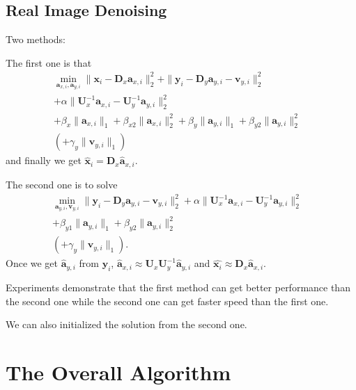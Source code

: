 \documentclass[10pt,twocolumn,letterpaper]{article}
\begin{document}
\subsection{Real Image Denoising}
Two methods:

The first one is that
\begin{equation}
\begin{split}
\min_{\mathbf{a}_{x,i},\mathbf{a}_{y,i}}
\|\mathbf{x}_{i}-\mathbf{D}_{x}\mathbf{a}_{x,i}\|_{2}^{2}
+
\|\mathbf{y}_{i}-\mathbf{D}_{y}\mathbf{a}_{y,i}-\mathbf{v}_{y,i}\|_{2}^{2}
\\
+
\alpha
\|\mathbf{U}_{x}^{-1}\mathbf{a}_{x,i}-\mathbf{U}_{y}^{-1}\mathbf{a}_{y,i}\|_{2}^{2}&
\\
+
\beta_{x}\|\mathbf{a}_{x,i}\|_{1}
+
\beta_{x2}\|\mathbf{a}_{x,i}\|_{2}^{2}
+
\beta_{y}\|\mathbf{a}_{y,i}\|_{1}
+
\beta_{y2}\|\mathbf{a}_{y,i}\|_{2}^{2}
&
\\
(+
\gamma_{y}\|\mathbf{v}_{y,i}\|_{1})
\end{split}
\end{equation}
and finally we get $\widehat{\mathbf{x}}_{i}=\mathbf{D}_{x}\widehat{\mathbf{a}}_{x,i}$.

The second one is to solve
\begin{equation}
\begin{split}
\min_{\mathbf{a}_{y,i},\mathbf{v}_{y,i}}
\|\mathbf{y}_{i}-\mathbf{D}_{y}\mathbf{a}_{y,i}-\mathbf{v}_{y,i}\|_{2}^{2}
+
\alpha
\|\mathbf{U}_{x}^{-1}\mathbf{a}_{x,i}-\mathbf{U}_{y}^{-1}\mathbf{a}_{y,i}\|_{2}^{2}&
\\
+
\beta_{y1}\|\mathbf{a}_{y,i}\|_{1}
+
\beta_{y2}\|\mathbf{a}_{y,i}\|_{2}^{2}
&
\\
(+
\gamma_{y}\|\mathbf{v}_{y,i}\|_{1}).
\end{split}
\end{equation}
Once we get $\widehat{\mathbf{a}}_{y,i}$ from $\mathbf{y}_{i}$, $\widehat{\mathbf{a}}_{x,i}\approx\mathbf{U}_{x}\mathbf{U}_{y}^{-1}\widehat{\mathbf{a}}_{y,i}$ and $\widehat{\mathbf{x}_{i}}\approx\mathbf{D}_{x}\widehat{\mathbf{a}}_{x,i}$.

Experiments demonstrate that the first method can get better performance than the second one while the second one can get faster speed than the first one.

We can also initialized the solution from the second one. 

\section{The Overall Algorithm}
\end{document}
